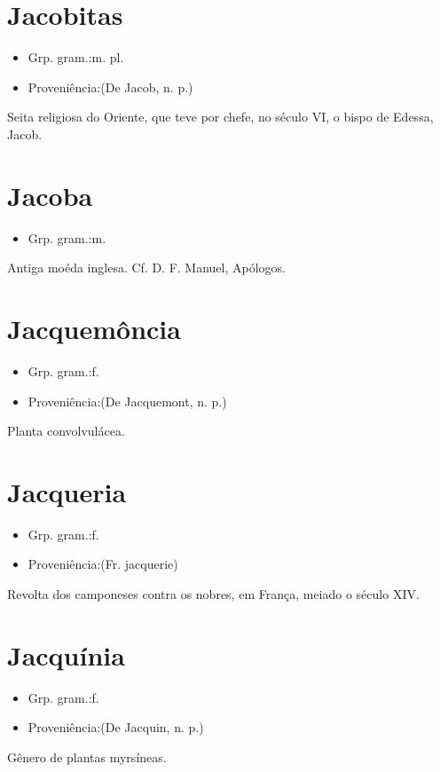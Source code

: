 \documentclass{article}
\begin{document}
\section{Jacobitas}
\begin{itemize}
\item {Grp. gram.:m. pl.}
\end{itemize}
\begin{itemize}
\item {Proveniência:(De \textunderscore Jacob\textunderscore , n. p.)}
\end{itemize}
Seita religiosa do Oriente, que teve por chefe, no século VI, o bispo de Edessa, Jacob.
\section{Jacoba}
\begin{itemize}
\item {Grp. gram.:m.}
\end{itemize}
Antiga moéda inglesa. Cf. D. F. Manuel, \textunderscore Apólogos\textunderscore .
\section{Jacquemôncia}
\begin{itemize}
\item {Grp. gram.:f.}
\end{itemize}
\begin{itemize}
\item {Proveniência:(De \textunderscore Jacquemont\textunderscore , n. p.)}
\end{itemize}
Planta convolvulácea.
\section{Jacqueria}
\begin{itemize}
\item {Grp. gram.:f.}
\end{itemize}
\begin{itemize}
\item {Proveniência:(Fr. \textunderscore jacquerie\textunderscore )}
\end{itemize}
Revolta dos camponeses contra os nobres, em França, meiado o século XIV.
\section{Jacquínia}
\begin{itemize}
\item {Grp. gram.:f.}
\end{itemize}
\begin{itemize}
\item {Proveniência:(De \textunderscore Jacquin\textunderscore , n. p.)}
\end{itemize}
Gênero de plantas myrsíneas.
\end{document}
